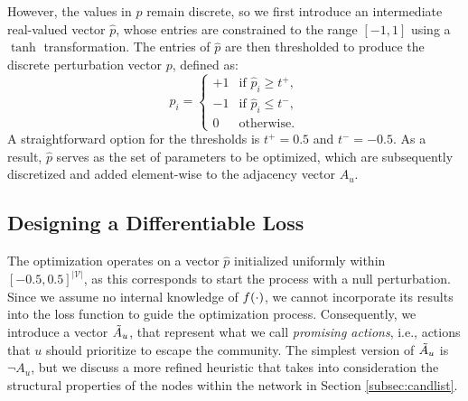 However, the values in $p$ remain discrete, so we first introduce an intermediate real-valued vector $\hat{p}$, whose entries are constrained to the range $ [-1,1]$ using a $\tanh$ transformation. The entries of $\hat{p}$ are then thresholded to produce the discrete perturbation vector $p$, defined as:
\begin{equation}
    p_{i} =
        \begin{cases} 
        +1 & \text{if } \hat{p}_{i} \geq t^+, \\
        -1 & \text{if } \hat{p}_{i} \leq t^-, \\
        0 & \text{otherwise.}
        \end{cases}
\end{equation}
A straightforward option for the thresholds is $t^+=0.5$ and $t^-=-0.5$.
As a result, $\hat{p}$ serves as the set of parameters to be optimized, which are subsequently discretized and added element-wise to the adjacency vector $A_u$.



\subsection{Designing a Differentiable Loss}
\label{subsec:loss}
The optimization operates on a 
vector $\hat{p}$ initialized uniformly within $[-0.5, 0.5]^{|\mathcal{V}|}$, as this corresponds to start the process with a null perturbation. 
Since we assume no internal knowledge of $f(\cdot)$, we cannot incorporate its results into the loss function to guide the optimization process. Consequently, we introduce a vector $\tilde{A}_{u}$, that represent what we call \emph{promising actions}, i.e., actions that $u$ should prioritize to escape the community. %
The simplest version of $\tilde{A}_{u}$ is $\lnot A_u$, but we discuss a more refined heuristic that takes into consideration the structural properties of the nodes within the network in Section \ref{subsec:candlist}.

